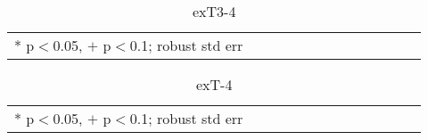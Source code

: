 \documentclass[10pt, letterpaper]{article}
\begin{document}
\begin{spacing}{1.4}
\begin{spacing}{.9} \begin{table}[H]\centering  \label{exT3-4} \begin{scriptsize} \begin{tabular}{p{1.8in}p{.5in}p{.5in}p{.5in}p{.5in}p{.5in}p{.5in}p{.5in}p{.5in}p{.5in}p{.5 in}p{.5in}p{.5 in}}\hline  \hline   * p$<$0.05, $+$ p$<$0.1; robust std err \end{tabular}\end{scriptsize}\caption{exT3-4}\end{table} \end{spacing}

\begin{spacing}{.9} \begin{table}[H]\centering  \label{exT-4} \begin{scriptsize} \begin{tabular}{p{1.8in}p{.5in}p{.5in}p{.5in}p{.5in}p{.5in}p{.5in}p{.5in}p{.5in}p{.5in}p{.5 in}p{.5in}p{.5 in}}\hline  \hline   * p$<$0.05, $+$ p$<$0.1; robust std err \end{tabular}\end{scriptsize}\caption{exT-4}\end{table} \end{spacing}







\end{spacing}
\end{document}
